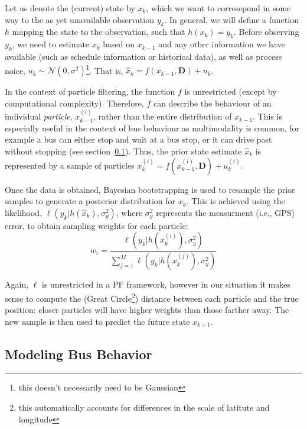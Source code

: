 \documentclass[12pt,a4paper]{article}
\begin{document}
Let us denote the (current) state by $x_k$, which we want to corresepond in some way to the as yet
unavailable observation $y_k$.
In general, we will define a function $h$ mapping the state to the observation,
such that $h(x_k) = y_k$.
Before observing $y_k$, we need to estimate $x_k$ based on $x_{k-1}$ and any other information
we have available (such as schedule information or historical data),
as well as process noice, $u_k \sim \mathcal{N}(0,\sigma^2)$\footnote{this doesn't necessarily need to be Gaussian}.
That is, $\hat x_k = f(x_{k-1}, \mathbf{D}) + u_k$.

In the context of particle filtering, the function $f$ is unrestricted (except by computational complexity).
Therefore, $f$ can describe the behaviour of an individual \emph{particle}, $x_{k-1}^{(i)}$, 
rather than the entire distribution of $x_{k-1}$.
This is especially useful in the context of bus behaviour as multimodality is common,
for example a bus can either stop and wait at a bus stop, or it can drive past without stopping
(see section~\ref{sec:busbehavior}).
Thus, the prior state estimate $\hat x_k$ is represented 
by a sample of particles $x_k^{(i)} = f(x_{k-1}^{(i)}, \mathbf{D}) + u_k^{(i)}$.


Once the data is obtained, Bayesian bootstrapping is used to resample the prior samples to generate
a posterior distribution for $x_k$.
This is achieved using the likelihood, $\ell(y_k | h(\hat x_k), \sigma_y^2)$,
where $\sigma_y^2$ represents the measurment (i.e., GPS) error,
to obtain sampling weights for each particle:
\begin{equation}
  \label{eq:particle_weights}
  w_i = \frac{\ell(y_k | h( x_k^{(i)}), \sigma_y^2)}{\sum_{j=1}^M \ell(y_k | h( x_k^{(j)}), \sigma_y^2)}
\end{equation}

Again, $\ell$ is unrestricted in a PF framework, however in our situation it makes sense to 
compute the (Great Circle\footnote{this automatically accounts for differences in the scale of latitute
and longitude}) 
distance between each particle and the true position:
closer particles will have higher weights than those farther away.
The new sample is then used to predict the future state $x_{k+1}$.







\subsection{Modeling Bus Behavior}
\label{sec:busbehavior}
\end{document}
